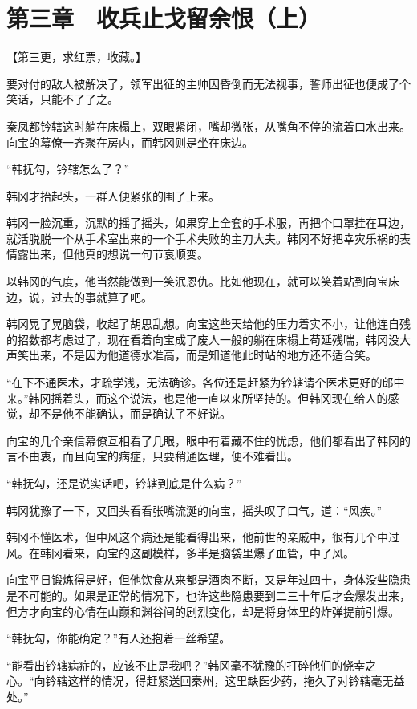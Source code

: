 \section{第三章　收兵止戈留余恨（上）}

【第三更，求红票，收藏。】

要对付的敌人被解决了，领军出征的主帅因昏倒而无法视事，誓师出征也便成了个笑话，只能不了了之。

秦凤都钤辖这时躺在床榻上，双眼紧闭，嘴却微张，从嘴角不停的流着口水出来。向宝的幕僚一齐聚在房内，而韩冈则是坐在床边。

“韩抚勾，钤辖怎么了？”

韩冈才抬起头，一群人便紧张的围了上来。

韩冈一脸沉重，沉默的摇了摇头，如果穿上全套的手术服，再把个口罩挂在耳边，就活脱脱一个从手术室出来的一个手术失败的主刀大夫。韩冈不好把幸灾乐祸的表情露出来，但他真的想说一句节哀顺变。

以韩冈的气度，他当然能做到一笑泯恩仇。比如他现在，就可以笑着站到向宝床边，说，过去的事就算了吧。

韩冈晃了晃脑袋，收起了胡思乱想。向宝这些天给他的压力着实不小，让他连自残的招数都考虑过了，现在看着向宝成了废人一般的躺在床榻上苟延残喘，韩冈没大声笑出来，不是因为他道德水准高，而是知道他此时站的地方还不适合笑。

“在下不通医术，才疏学浅，无法确诊。各位还是赶紧为钤辖请个医术更好的郎中来。”韩冈摇着头，而这个说法，也是他一直以来所坚持的。但韩冈现在给人的感觉，却不是他不能确认，而是确认了不好说。

向宝的几个亲信幕僚互相看了几眼，眼中有着藏不住的忧虑，他们都看出了韩冈的言不由衷，而且向宝的病症，只要稍通医理，便不难看出。

“韩抚勾，还是说实话吧，钤辖到底是什么病？”

韩冈犹豫了一下，又回头看看张嘴流涎的向宝，摇头叹了口气，道：“风疾。”

韩冈不懂医术，但中风这个病还是能看得出来，他前世的亲戚中，很有几个中过风。在韩冈看来，向宝的这副模样，多半是脑袋里爆了血管，中了风。

向宝平日锻炼得是好，但他饮食从来都是酒肉不断，又是年过四十，身体没些隐患是不可能的。如果是正常的情况下，也许这些隐患要到二三十年后才会爆发出来，但方才向宝的心情在山巅和渊谷间的剧烈变化，却是将身体里的炸弹提前引爆。

“韩抚勾，你能确定？”有人还抱着一丝希望。

“能看出钤辖病症的，应该不止是我吧？”韩冈毫不犹豫的打碎他们的侥幸之心。“向钤辖这样的情况，得赶紧送回秦州，这里缺医少药，拖久了对钤辖毫无益处。”

